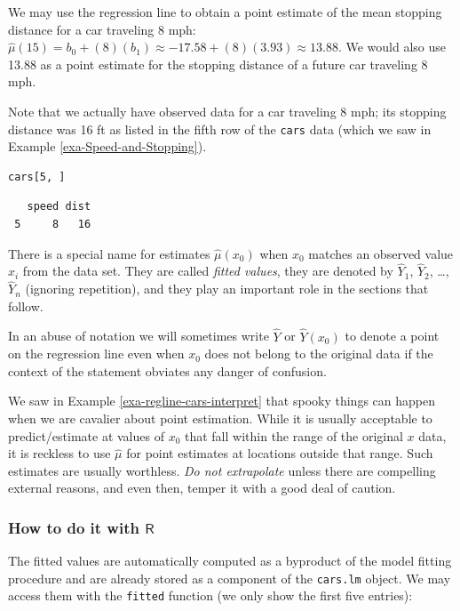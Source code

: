 \documentclass[captions=tableheading]{scrbook}
\begin{document}
\begin{example}
We may use the regression line to obtain a point estimate of the mean stopping distance for a car traveling 8 mph: \( \hat{\mu}(15) = b_{0} + (8) (b_{1}) \approx  -17.58 + (8) (  3.93 ) \approx 13.88 \). We would also use 13.88 as a point estimate for the stopping distance of a future car traveling 8 mph. 
\end{example}

Note that we actually have observed data for a car traveling 8 mph; its stopping distance was 16 ft as listed in the fifth row of the \texttt{cars} data (which we saw in Example \ref{exa-Speed-and-Stopping}).


\lstset{language=R}
\begin{lstlisting}
cars[5, ]
\end{lstlisting}

\begin{verbatim}
   speed dist
 5     8   16
\end{verbatim}

There is a special name for estimates \( \hat{\mu}(x_{0}) \) when \( x_{0} \) matches an observed value \(x_{i}\) from the data set. They are called \emph{fitted values}, they are denoted by \(\hat{Y}_{1}\), \(\hat{Y}_{2}\), \ldots{}, \(\hat{Y}_{n}\) (ignoring repetition), and they play an important role in the sections that follow. 

In an abuse of notation we will sometimes write \(\hat{Y}\) or \(\hat{Y}(x_{0})\) to denote a point on the regression line even when \(x_{0}\) does not belong to the original data if the context of the statement obviates any danger of confusion.

We saw in Example \ref{exa-regline-cars-interpret} that spooky things can happen when we are cavalier about point estimation. While it is usually acceptable to predict/estimate at values of \(x_{0}\) that fall within the range of the original \(x\) data, it is reckless to use \(\hat{\mu}\) for point estimates at locations outside that range. Such estimates are usually worthless. \emph{Do not extrapolate} unless there are compelling external reasons, and even then, temper it with a good deal of caution.
\subsubsection{How to do it with \(\mathsf{R}\)}
\label{sec-11-2-2-1}


The fitted values are automatically computed as a byproduct of the model fitting procedure and are already stored as a component of the \texttt{cars.lm} object. We may access them with the \texttt{fitted} function (we only show the first five entries):
\end{document}
